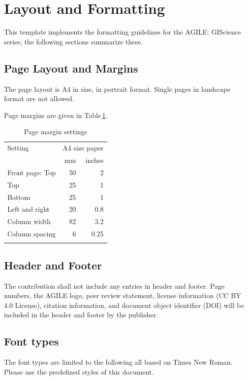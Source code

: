 \documentclass[agile, final]{copernicus-agile}
\begin{document}
\section{Layout and Formatting}
This template implements the formatting guidelines for the AGILE: GIScience series; the following sections summarize these.

\subsection{Page Layout and Margins}
The page layout is A4 in size, in portrait format. Single pages in landscape format are not allowed.

Page margins are given in Table\,\ref{tab:1}.

\begin{table}[h]
\caption{Page margin settings}
\begin{tabular}{lrr}
\tophline
Setting&\multicolumn{2}{c}{A4 size paper}\\
\middlehline
&mm&inches\\ \cline{2-3}
Front page: Top&50&2\\
Top&25&1\\
Bottom&25&1\\
Left and right&20&0.8\\
Column width&82&3.2\\
Column spacing&6&0.25\\
\bottomhline
\end{tabular}
\label{tab:1} %
\end{table}


\subsection{Header and Footer}
The contribution shall not include any entries in header and footer. Page numbers, the AGILE logo, peer review statement, license information (CC BY 4.0 License), citation information, and document object identifier (DOI) will be included in the header and footer by the publisher.

\subsection{Font types}
The font types are limited to the following all based on Times New Roman. Please use the predefined styles of this document.
\end{document}
